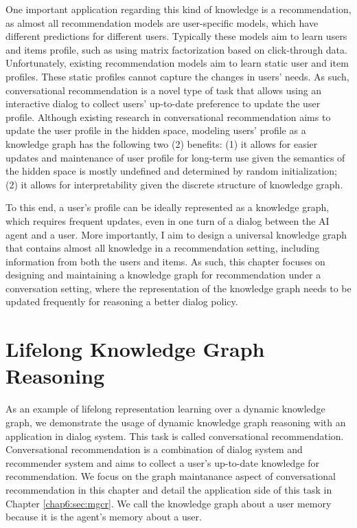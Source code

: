 One important application regarding this kind of knowledge is a recommendation, as almost all recommendation models are user-specific models, which have different predictions for different users.
Typically these models aim to learn users and items profile, such as using matrix factorization based on click-through data.
Unfortunately, existing recommendation models aim to learn static user and item profiles.
These static profiles cannot capture the changes in users' needs.
As such, conversational recommendation \cite{li2018towards,kang2019recommendation} is a novel type of task that allows using an interactive dialog to collect users' up-to-date preference to update the user profile.
Although existing research in conversational recommendation aims to update the user profile in the hidden space, modeling users' profile as a knowledge graph has the following two (2) benefits: (1) it allows for easier updates and maintenance of user profile for long-term use given the semantics of the hidden space is mostly undefined and determined by random initialization; (2) it allows for interpretability given the discrete structure of knowledge graph.

To this end, a user's profile can be ideally represented as a knowledge graph, which requires frequent updates, even in one turn of a dialog between the AI agent and a user.
More importantly, I aim to design a universal knowledge graph that contains almost all knowledge in a recommendation setting, including information from both the users and items.
As such, this chapter focuses on designing and maintaining a knowledge graph for recommendation under a conversation setting, where the representation of the knowledge graph needs to be updated frequently for reasoning a better dialog policy.

\section{Lifelong Knowledge Graph Reasoning}
\label{chap5:sec:reason}

As an example of lifelong representation learning over a dynamic knowledge graph, we demonstrate the usage of dynamic knowledge graph reasoning with an application in dialog system. 
This task is called conversational recommendation. 
Conversational recommendation is a combination of dialog system and recommender system and aims to collect a user's up-to-date knowledge for recommendation. 
We focus on the graph maintanance aspect of conversational recommendation in this chapter and  detail the application side of this task in Chapter \ref{chap6:sec:mgcr}.
We call the knowledge graph about a user memory because it is the agent's memory about a user.
 
